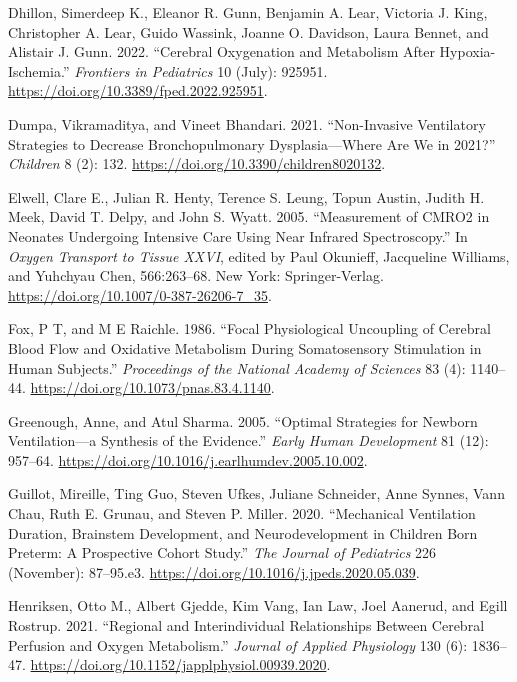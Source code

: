 \documentclass[
  letterpaper,
  DIV=11,
  numbers=noendperiod]{scrartcl}
\newlength{\cslhangindent}
\newenvironment{CSLReferences}[2] %
 {\begin{list}{}{%
  \setlength{\itemindent}{0pt}
  \setlength{\leftmargin}{0pt}
  \setlength{\parsep}{0pt}
  \ifodd #1
   \setlength{\leftmargin}{\cslhangindent}
   \setlength{\itemindent}{-1\cslhangindent}
  \fi
  \setlength{\itemsep}{#2\baselineskip}}}
 {\end{list}}
\begin{document}
\begin{CSLReferences}{1}{0}
Dhillon, Simerdeep K., Eleanor R. Gunn, Benjamin A. Lear, Victoria J.
King, Christopher A. Lear, Guido Wassink, Joanne O. Davidson, Laura
Bennet, and Alistair J. Gunn. 2022. {``Cerebral {Oxygenation} and
{Metabolism After Hypoxia-Ischemia}.''} \emph{Frontiers in Pediatrics}
10 (July): 925951. \url{https://doi.org/10.3389/fped.2022.925951}.

Dumpa, Vikramaditya, and Vineet Bhandari. 2021. {``Non-{Invasive
Ventilatory Strategies} to {Decrease Bronchopulmonary
Dysplasia}---{Where Are We} in 2021?''} \emph{Children} 8 (2): 132.
\url{https://doi.org/10.3390/children8020132}.

Elwell, Clare E., Julian R. Henty, Terence S. Leung, Topun Austin,
Judith H. Meek, David T. Delpy, and John S. Wyatt. 2005. {``Measurement
of {CMRO2} in {Neonates Undergoing Intensive Care Using Near Infrared
Spectroscopy}.''} In \emph{Oxygen {Transport} to {Tissue XXVI}}, edited
by Paul Okunieff, Jacqueline Williams, and Yuhchyau Chen, 566:263--68.
New York: Springer-Verlag.
\url{https://doi.org/10.1007/0-387-26206-7_35}.

Fox, P T, and M E Raichle. 1986. {``Focal Physiological Uncoupling of
Cerebral Blood Flow and Oxidative Metabolism During Somatosensory
Stimulation in Human Subjects.''} \emph{Proceedings of the National
Academy of Sciences} 83 (4): 1140--44.
\url{https://doi.org/10.1073/pnas.83.4.1140}.

Greenough, Anne, and Atul Sharma. 2005. {``Optimal Strategies for
Newborn Ventilation---a Synthesis of the Evidence.''} \emph{Early Human
Development} 81 (12): 957--64.
\url{https://doi.org/10.1016/j.earlhumdev.2005.10.002}.

Guillot, Mireille, Ting Guo, Steven Ufkes, Juliane Schneider, Anne
Synnes, Vann Chau, Ruth E. Grunau, and Steven P. Miller. 2020.
{``Mechanical {Ventilation Duration}, {Brainstem Development}, and
{Neurodevelopment} in {Children Born Preterm}: {A Prospective Cohort
Study}.''} \emph{The Journal of Pediatrics} 226 (November): 87--95.e3.
\url{https://doi.org/10.1016/j.jpeds.2020.05.039}.

Henriksen, Otto M., Albert Gjedde, Kim Vang, Ian Law, Joel Aanerud, and
Egill Rostrup. 2021. {``Regional and Interindividual Relationships
Between Cerebral Perfusion and Oxygen Metabolism.''} \emph{Journal of
Applied Physiology} 130 (6): 1836--47.
\url{https://doi.org/10.1152/japplphysiol.00939.2020}.


\end{CSLReferences}
\end{document}
